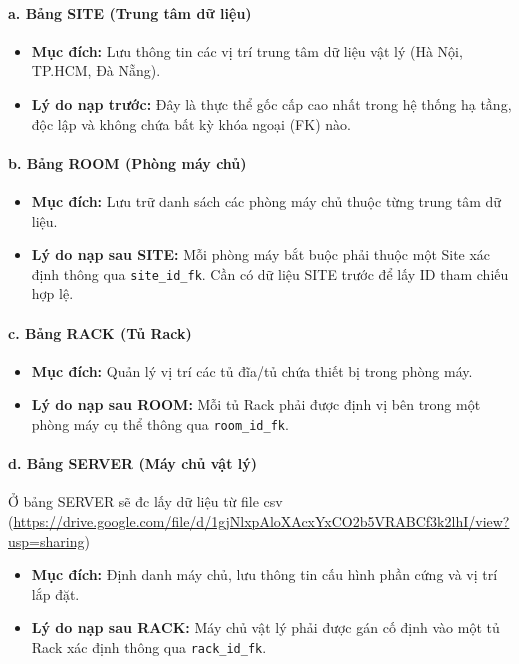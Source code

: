 \paragraph{a. Bảng SITE (Trung tâm dữ liệu)}
\begin{itemize}
    \item \textbf{Mục đích:} Lưu thông tin các vị trí trung tâm dữ liệu vật lý (Hà Nội, TP.HCM, Đà Nẵng).
    \item \textbf{Lý do nạp trước:} Đây là thực thể gốc cấp cao nhất trong hệ thống hạ tầng, độc lập và không chứa bất kỳ khóa ngoại (FK) nào.
\end{itemize}

\paragraph{b. Bảng ROOM (Phòng máy chủ)}
\begin{itemize}
    \item \textbf{Mục đích:} Lưu trữ danh sách các phòng máy chủ thuộc từng trung tâm dữ liệu.
    \item \textbf{Lý do nạp sau SITE:} Mỗi phòng máy bắt buộc phải thuộc một Site xác định thông qua \texttt{site\_id\_fk}. Cần có dữ liệu SITE trước để lấy ID tham chiếu hợp lệ.
\end{itemize}

\paragraph{c. Bảng RACK (Tủ Rack)}
\begin{itemize}
    \item \textbf{Mục đích:} Quản lý vị trí các tủ đĩa/tủ chứa thiết bị trong phòng máy.
    \item \textbf{Lý do nạp sau ROOM:} Mỗi tủ Rack phải được định vị bên trong một phòng máy cụ thể thông qua \texttt{room\_id\_fk}.
\end{itemize}

\paragraph{d. Bảng SERVER (Máy chủ vật lý)}
\noindent Ở bảng SERVER sẽ đc lấy dữ liệu từ file csv (\url{https://drive.google.com/file/d/1gjNlxpAloXAcxYxCO2b5VRABCf3k2lhI/view?usp=sharing})
\begin{itemize}
    \item \textbf{Mục đích:} Định danh máy chủ, lưu thông tin cấu hình phần cứng và vị trí lắp đặt.
    \item \textbf{Lý do nạp sau RACK:} Máy chủ vật lý phải được gán cố định vào một tủ Rack xác định thông qua \texttt{rack\_id\_fk}.
\end{itemize}

